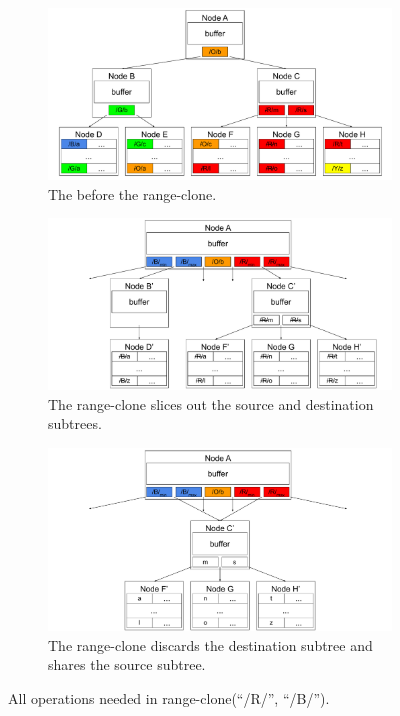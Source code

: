 \begin{figure}
    \begin{subfigure}{\textwidth}
        \centering
        \includegraphics[width=.7\linewidth]{fig/rr-1}
        \caption{\label{subfig:rc-1} The \bet before the range-clone.}
    \end{subfigure}
    \begin{subfigure}{\textwidth}
        \centering
        \includegraphics[width=.7\linewidth]{fig/rr-2}
        \caption{\label{subfig:rc-2} The range-clone slices out the source and
            destination subtrees.}
    \end{subfigure}
    \begin{subfigure}{\textwidth}
        \centering
        \includegraphics[width=.65\linewidth]{fig/rc-3}
        \caption{\label{subfig:rc-3} The range-clone discards the destination
            subtree and shares the source subtree.}
    \end{subfigure}
    \caption[All operations in range-clone]{\label{fig:rc}
        All operations needed in range-clone(``/R/'', ``/B/'').}
\end{figure}

